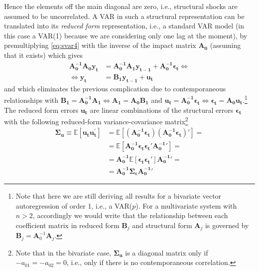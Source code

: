 \documentclass[a4paper,11pt,listof=nochaptergap,oneside,pointednumbers,bibtotoc,bigheadings,liststotoc]{scrbook}
\theoremstyle{mysatz}
\theoremstyle{mydefinition}
\theoremstyle{mybemerkung}
\newcommand{\vect}[1]{\boldsymbol{\mathbf{#1}}}
\begin{document}
Hence the elements off the main diagonal are zero, i.e., structural shocks are assumed to be uncorrelated. A VAR in such a structural representation can be translated into its \textit{reduced form} representation, i.e., a standard VAR model (in this case a VAR(1) because we are considering only one lag at the moment), by premultiplying \ref{eq:svar4} with the inverse of the impact matrix $\vect{A_0}$ (assuming that it exists) which gives
\begin{equation} \label{eq:svar5}
\begin{split}
	          \vect{A_0^{-1}}\vect{A_0}\vect{y_t} & = \vect{A_0^{-1}}\vect{A_1}\vect{y_{t-1}} + \vect{A_0^{-1}}\vect{\epsilon_t}     \iff \\
	\iff 						\vect{y_t} & = \vect{B_1}\vect{y_{t-1}} + \vect{u_t}
\end{split}								
\end{equation}
and which eliminates the previous complication due to contemporaneous relationships with $\vect{B_1} = \vect{A_0^{-1}}\vect{A_1} \iff \vect{A_1} = \vect{A_0}\vect{B_1}$ and $\vect{u_t} = \vect{A_0^{-1}}\vect{\epsilon_t} \iff \vect{\epsilon_t} = \vect{A_0}\vect{u_t}$.\footnote{Note that here we are still deriving all results for a bivariate vector autoregression of order 1, i.e., a VAR($p$). For a multivariate system with $n>2$, accordingly we would write that the relationship between each coefficient matrix in reduced form $\vect{B}_j$ and structural form $\vect{A}_j$ is governed by $\vect{B}_j = \vect{A}_0^{-1}\vect{A}_j$.}\\
The reduced form errors $\vect{u_t}$ are linear combinations of the structural errors $\vect{\epsilon_t}$ with the following reduced-form variance-covariance matrix\footnote{Note that in the bivariate case, $\vect{\Sigma_u}$ is a diagonal matrix only if $-a_{01} = -a_{02} = 0$, i.e., only if there is no contemporaneous correlation.}
\begin{equation} \label{eq:svar6}
\begin{split}
 		\vect{\Sigma_u} \equiv \mathbb{E}[\vect{u_t}\vect{u_t^'}] & = \mathbb{E}[(\vect{A_0^{-1}}\vect{\epsilon_t}) (\vect{A_0^{-1}}\vect{\epsilon_t})' ] = \\
								& = \mathbb{E}[\vect{A_0^{-1}}\vect{\epsilon_t} \vect{\epsilon_t}'\vect{A_0^{-1}}'] = \\
								& = \vect{A_0^{-1}}\mathbb{E}[\vect{\epsilon_t} \vect{\epsilon_t}']\vect{A_0^{-1}}' = \\
								& = \vect{A_0^{-1}}\vect{\Sigma_\epsilon}\vect{A_0^{-1}}'
\end{split}								
\end{equation}
\end{document}
